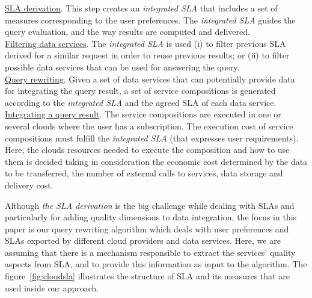 \noindent \underline{SLA derivation}. This step creates an \textsl{integrated SLA} that includes a set of measures corresponding to the user preferences. The \textsl{integrated SLA} guides the query evaluation, and the way results are computed and delivered. \\
\underline{Filtering data services}. The \textsl{integrated SLA} is used (i) to filter previous SLA derived for a similar request in order to reuse previous results; or (ii) to filter possible data services that can be used for answering the query. \\
\underline{Query rewriting}. Given a set of data services that can potentially provide data for integrating the query result, a set of service compositions is generated according to the \textsl{integrated SLA} and the agreed SLA of each data service. \\
\underline{Integrating a query result}. The service compositions are executed in one or several clouds where the user has a subscription. The execution cost of service compositions must fulfill the \textsl{integrated SLA} (that expresses user requirements). Here, the clouds resources needed to execute the composition and how to use them is decided taking in consideration the economic cost determined by the data to be transferred, the number of external calls to services, data storage and delivery cost.
\bigskip

Although \textit{the SLA derivation} is the big challenge while dealing with SLAs and particularly for adding quality dimensions to data integration, the focus in this paper is our query rewriting algorithm which deals with user preferences and SLAs exported by different cloud providers and data services. Here, we are assuming that there is a mechanism responsible to extract the services' quality aspects from SLA, and to provide this information as input to the algorithm. The figure~\ref{fig:cloudsla} illustrates the structure of SLA and its measures that are used inside our approach.


